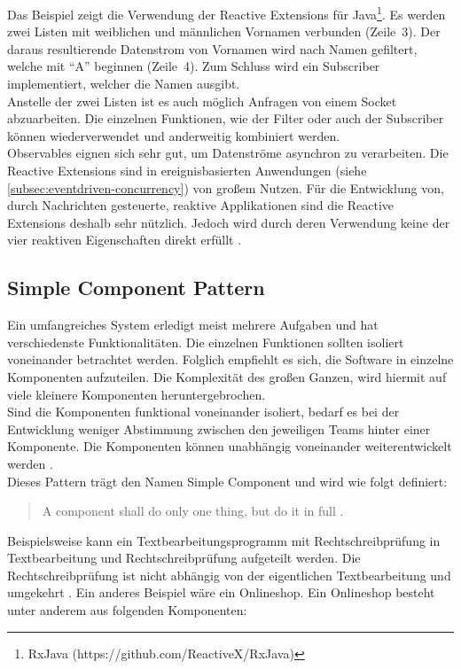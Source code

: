 Das Beispiel zeigt die Verwendung der Reactive Extensions für Java\footnote{RxJava (https://github.com/ReactiveX/RxJava)}. Es werden zwei Listen mit weiblichen und männlichen Vornamen verbunden (Zeile~3). Der daraus resultierende Datenstrom von Vornamen wird nach Namen gefiltert, welche mit \enquote{A} beginnen (Zeile~4). Zum Schluss wird ein Subscriber implementiert, welcher die Namen ausgibt.\\
Anstelle der zwei Listen ist es auch möglich Anfragen von einem Socket abzuarbeiten. Die einzelnen Funktionen, wie der Filter oder auch der Subscriber können wiederverwendet und anderweitig kombiniert werden.\\

Observables eignen sich sehr gut, um Datenströme asynchron zu verarbeiten. Die Reactive Extensions sind in ereignisbasierten Anwendungen (siehe \ref{subsec:eventdriven-concurrency}) von großem Nutzen. Für die Entwicklung von, durch Nachrichten gesteuerte, reaktive Applikationen sind die Reactive Extensions deshalb sehr nützlich. Jedoch wird durch deren Verwendung keine der vier reaktiven Eigenschaften direkt erfüllt \cite[S.~82]{kuhn_reactive_2015}.

\pagebreak

\subsection{Simple Component Pattern}\label{subsec:simple-component-pattern}
Ein umfangreiches System erledigt meist mehrere Aufgaben und hat verschiedenste Funktionalitäten. Die einzelnen Funktionen sollten isoliert voneinander betrachtet werden. Folglich empfiehlt es sich, die Software in einzelne Komponenten aufzuteilen. Die Komplexität des großen Ganzen, wird hiermit auf viele kleinere Komponenten heruntergebrochen.\\
Sind die Komponenten funktional voneinander isoliert, bedarf es bei der Entwicklung weniger Abstimmung zwischen den jeweiligen Teams hinter einer Komponente. Die Komponenten können unabhängig voneinander weiterentwickelt werden \cite[S.~215]{newman_building_2015}.\\
Dieses Pattern trägt den Namen Simple Component und wird wie folgt definiert:

\begin{quotation}
A component shall do only one thing, but do it in full \cite[S.~185]{kuhn_reactive_2015}.
\end{quotation}

Beispielsweise kann ein Textbearbeitungsprogramm mit Rechtschreibprüfung in Textbearbeitung und Rechtschreibprüfung aufgeteilt werden. Die Rechtschreibprüfung ist nicht abhängig von der eigentlichen Textbearbeitung und umgekehrt \cite[S.~185]{kuhn_reactive_2015}. Ein anderes Beispiel wäre ein Onlineshop. Ein Onlineshop besteht unter anderem aus folgenden Komponenten:


